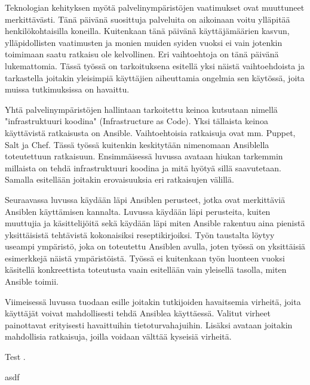 Teknologian kehityksen myötä palvelinympäristöjen vaatimukset ovat muuttuneet merkittävästi.
Tänä päivänä suosittuja palveluita on aikoinaan voitu ylläpitää henkilökohtaisilla koneilla.
Kuitenkaan tänä päivänä käyttäjämäärien kasvun, ylläpidollisten vaatimusten ja monien muiden
syiden vuoksi ei vain jotenkin toimimaan saatu ratkaisu ole kelvollinen. Eri vaihtoehtoja on
tänä päivänä lukemattomia. Tässä työssä on tarkoituksena esitellä yksi näistä vaihtoehdoista
ja tarkastella joitakin yleisimpiä käyttäjien aiheuttamia ongelmia sen käytössä, joita muissa
tutkimuksissa on havaittu.

Yhtä palvelinympäristöjen hallintaan tarkoitettu keinoa kutsutaan nimellä "infrastruktuuri
koodina" (Infrastructure as Code). Yksi tällaista keinoa käyttävistä ratkaisusta on Ansible.
Vaihtoehtoisia ratkaisuja ovat mm. Puppet, Salt ja Chef. Tässä työssä kuitenkin keskitytään
nimenomaan Ansiblella toteutettuun ratkaisuun. Ensimmäisessä luvussa avataan hiukan tarkemmin
millaista on tehdä infrastruktuuri koodina ja mitä hyötyä sillä saavutetaan. Samalla
esitellään joitakin erovaisuuksia eri ratkaisujen välillä.

Seuraavassa luvussa käydään läpi Ansiblen perusteet, jotka ovat merkittäviä Ansiblen
käyttämisen kannalta. Luvussa käydään läpi perusteita, kuiten muuttujia ja käsittelijöitä
sekä käydään läpi miten Ansible rakentuu aina pienistä yksittäisistä tehtävistä kokonaisiksi
reseptikirjoiksi. Työn taustalta löytyy useampi ympäristö, joka on toteutettu Ansiblen avulla,
joten  työssä on yksittäisiä esimerkkejä näistä ympäristöistä. Työssä ei kuitenkaan työn
luonteen vuoksi käsitellä konkreettista toteutusta vaain esitellään vain yleisellä tasolla,
miten Ansible toimii.

Viimeisessä luvussa tuodaan esille joitakin tutkijoiden havaitsemia virheitä, joita käyttäjät
voivat mahdollisesti tehdä Ansiblea käyttäessä. Valitut virheet painottavat erityisesti
havaittuihin tietoturvahajuihin. Lisäksi avataan joitakin mahdollisia ratkaisuja, joilla
voidaan välttää kyseisiä virheitä.

Test \parencite{AnsibleDocs,alma9911217298805973,KiefMorris2020IaC2,RahmanAkond2021SSiA,JamesFreeman2020HEAo,GauravAgarwal2021MDP,JamesFreeman2020PA2}.

asdf